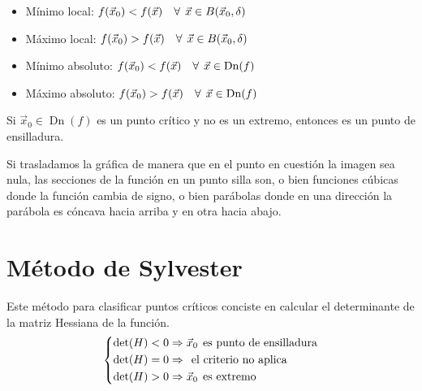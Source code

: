 \begin{itemize}
    \item Mínimo local: $f(\Vec{x}_0)<f(\Vec{x}) \quad \forall \hspace{1ex} \Vec{x} \in B(\Vec{x}_0, \delta)$

    \item Máximo local: $f(\Vec{x}_0)>f(\Vec{x}) \quad \forall \hspace{1ex} \Vec{x} \in B(\Vec{x}_0, \delta)$

    \item Mínimo absoluto: $f(\Vec{x}_0)<f(\Vec{x}) \quad \forall \hspace{1ex} \Vec{x} \in \operatorname{Dn}(f)$

    \item Máximo absoluto: $f(\Vec{x}_0)>f(\Vec{x}) \quad \forall \hspace{1ex} \Vec{x} \in \operatorname{Dn}(f)$
\end{itemize}

Si $\Vec{x}_0 \in \operatorname{Dn}(f)$ es un punto crítico y no es un extremo, entonces es un punto de ensilladura.

Si trasladamos la gráfica de manera que en el punto en cuestión la imagen sea nula, las secciones de la función en un punto silla son, o bien funciones cúbicas donde la función cambia de signo, o bien parábolas donde en una dirección la parábola es cóncava hacia arriba y en otra hacia abajo.


\section{Método de Sylvester}

Este método para clasificar puntos críticos conciste en calcular el determinante de la matriz Hessiana de la función.
\begin{equation*}
    \left\{
    \begin{aligned}
        \operatorname{det}(H) < 0 & \Rightarrow \Vec{x}_0 \hspace{1ex} \textrm{es punto de ensilladura}
        \\
        \operatorname{det}(H) = 0 &\Rightarrow \hspace{1ex} \textrm{el criterio no aplica}
        \\
        \operatorname{det}(H) > 0 &\Rightarrow \Vec{x}_0 \hspace{1ex} \textrm{es extremo}
    \end{aligned}
    \right.
\end{equation*}

